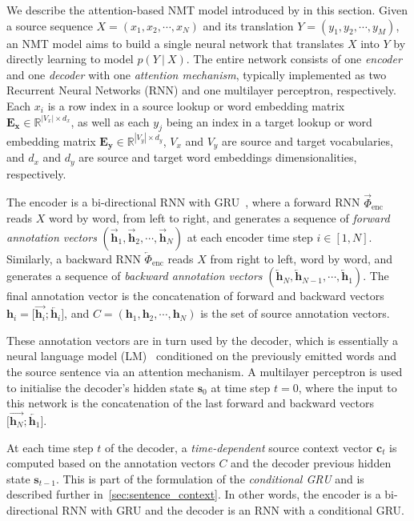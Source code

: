 \documentclass[11pt]{article}
\newcommand\given[1][]{\:#1\vert\:}
\begin{document}
We describe the attention-based NMT model introduced by  in this section.
Given a source sequence ${X = (x_1, x_2, \cdots, x_N)}$ and
its translation ${Y = (y_1, y_2, \cdots, y_M)}$,
an NMT model aims to build a single neural network that translates $X$ into $Y$ by directly learning to model $p(Y \given X)$.
The entire network consists of one \emph{encoder} and one \emph{decoder} with one \emph{attention mechanism}, typically implemented as two Recurrent Neural Networks (RNN) and one multilayer perceptron, respectively.
Each $x_i$ is a row index in a source lookup or word embedding matrix
$\bm{E_x} \in \mathbb{R}^{|V_x| \times d_x}$,
as well as each $y_j$ being an index in a target lookup or word embedding matrix
$\bm{E_y} \in \mathbb{R}^{|V_y| \times d_y}$,
$V_x$ and $V_y$ are source and target vocabularies, and $d_x$ and $d_y$ are source and target word embeddings dimensionalities, respectively.

The encoder is a bi-directional RNN with GRU~\cite{Choetal2014b}, where a forward RNN $\overrightarrow{\Phi}_{\text{enc}}$ reads $X$ word by word, from left to right, and generates a sequence of \emph{forward annotation vectors} ${(\overrightarrow{\bm{h}}_1, \overrightarrow{\bm{h}}_2, \cdots, \overrightarrow{\bm{h}}_N)}$ at each encoder time step ${i \in [1,N]}$.
Similarly, a backward RNN $\overleftarrow{\Phi}_{\text{enc}}$ reads $X$ from right to left, word by word, and generates a sequence of \emph{backward annotation vectors} ${(\overleftarrow{\bm{h}}_N, \overleftarrow{\bm{h}}_{N-1},\cdots, \overleftarrow{\bm{h}}_1)}$.
The final annotation vector is the concatenation of forward and backward vectors $\bm{h}_i = \big[ \overrightarrow{\bm{h}_i}; \overleftarrow{\bm{h}_i} \big]$, and ${C = (\bm{h}_1, \bm{h}_2, \cdots, \bm{h}_N)}$ is the set of source annotation vectors.


These annotation vectors are in turn used by the decoder, which is essentially a neural language model (LM)~\cite{Bengioetal2003} conditioned on the previously emitted words and the source sentence via an attention mechanism.
A multilayer perceptron is used to initialise the decoder's hidden state $\bm{s}_0$ at time step $t=0$, where the input to this network is the concatenation of the last forward and backward vectors $\big[ \overrightarrow{\bm{h}_N}; \overleftarrow{\bm{h}_1} \big]$.

At each time step $t$ of the decoder, a \emph{time-dependent} source context vector $\bm{c}_t$ is computed based on the annotation vectors $C$ and the decoder previous hidden state $\bm{s}_{t-1}$.
This is part of the formulation of the \textit{conditional GRU} and is described further in~\cref{sec:sentence_context}.
In other words, the encoder is a bi-directional RNN with GRU and the decoder is an RNN with a conditional GRU.
\end{document}
